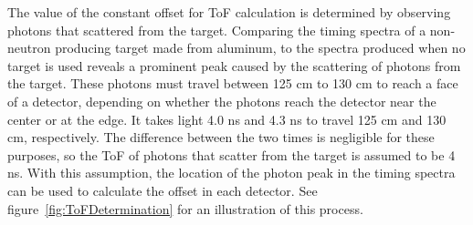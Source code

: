 %
The value of the constant offset for ToF calculation is determined by observing photons that scattered from the target.
Comparing the timing spectra of a non-neutron producing target made from aluminum, to the spectra produced when no target is used reveals a prominent peak caused by the scattering of photons from the target.
These photons must travel between 125 cm to 130 cm to reach a face of a detector, depending on whether the photons reach the detector near the center or at the edge.
It takes light 4.0 ns and 4.3 ns to travel 125 cm and 130 cm, respectively.
The difference between the two times is negligible for these purposes, so the ToF of photons that scatter from the target is assumed to be 4 ns.
With this assumption, the location of the photon peak in the timing spectra can be used to calculate the offset in each detector.
See figure~\ref{fig:ToFDetermination} for an illustration of this process.
